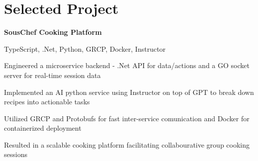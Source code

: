
\newenvironment{twocolentry_proj}[2][]{
    \onecolentry
    \def\secondColumn{#2}
    \setcolumnwidth{\fill, 7 cm}
    \begin{paracol}{2}
}{
    \switchcolumn \raggedleft \secondColumn
    \end{paracol}
    \endonecolentry
} %

\vspace{5 pt - 0.4 cm}
\section{Selected Project}
\begin{twocolentry_proj}{
    \mbox{}%
}

\textbf{SousChef Cooking Platform}
\end{twocolentry_proj}

\vspace{0.10 cm}
\begin{onecolentry}
    \small TypeScript, .Net, Python, GRCP, Docker, Instructor 
    \begin{highlights}
        \item Engineered a microservice backend - .Net API for data/actions and a GO socket server for real-time session data
        \item Implemented an AI python service using Instructor on top of GPT to break down recipes into actionable tasks
        \item Utilized GRCP and Protobufs for fast inter-service comunication and Docker for containerized deployment
        \item Resulted in a scalable cooking platform facilitating collabourative group cooking sessions
    \end{highlights}
\end{onecolentry}
